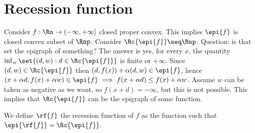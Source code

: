 \section{Recession function}

Consider $f : \Rn \to (-\infty,+\infty]$ closed proper convex. This implies $\epi{f}$ is closed convex subset of $\Rnp$. Consider $\Rc{\epi{f}} \seq \Rnp$. Question: is that set the epigraph of something? The answer is yes, for every $x$, the quantity $\inf_w \set{(d,w) : d \in \Rc{\epi{f}}}$ is finite or $+\infty$. Since $(d,w) \in \Rc{\epi{f}}$ then $(d,f(x)) + \alpha (d,w) \in \epi{f}$, hence $(x + \alpha d, f(x) + \alpha w) \in \epi{f} \implies f(x+\alpha d) \le f(x) + \alpha w$. Assume $w$ can be taken as negative as we want, so $f(x + d) = -\infty$, but this is not possible. This implies that $\Rc{\epi{f}}$ can be the epigraph of some function.

\begin{definition}

    We define $\rf{f}$ the recession function of $f$ as the function such that $\epi{\rf{f}} = \Rc{\epi{f}}$.

\end{definition}

